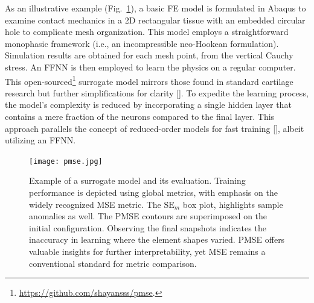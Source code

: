 \documentclass[12pt,a4paper]{report}
\begin{document}
As an illustrative example (Fig.~\ref{basic_surrogate}), a basic FE model is formulated in Abaqus to examine contact mechanics in a 2D rectangular tissue with an embedded circular hole to complicate mesh organization. This model employs a straightforward monophasic framework (i.e., an incompressible neo-Hookean formulation). Simulation results are obtained for each mesh point, from the vertical Cauchy stress. An FFNN is then employed to learn the physics on a regular computer. This open-sourced\footnote{\href{https://github.com/shayansss/pmse}{https://github.com/shayansss/pmse}.} surrogate model mirrors those found in standard cartilage research but further simplifications for clarity [\cite{paiva2012,arbabi2016a,arbabi2016b}]. To expedite the learning process, the model's complexity is reduced by incorporating a single hidden layer that contains a mere fraction of the neurons compared to the final layer. This approach parallels the concept of reduced-order models for fast training [\cite{pant2021}], albeit utilizing an FFNN.
%
\begin{figure}
    \centering
    \texttt{[image: pmse.jpg]}
    \caption{Example of a surrogate model and its evaluation. Training performance is depicted using global metrics, with emphasis on the widely recognized MSE metric. The \( \textrm{SE}_m \) box plot, highlights sample anomalies as well. The PMSE contours are superimposed on the initial configuration. Observing the final snapshots indicates the inaccuracy in learning where the element shapes varied. PMSE offers valuable insights for further interpretability, yet MSE remains a conventional standard for metric comparison.}
    \label{basic_surrogate}
\end{figure}
\end{document}

